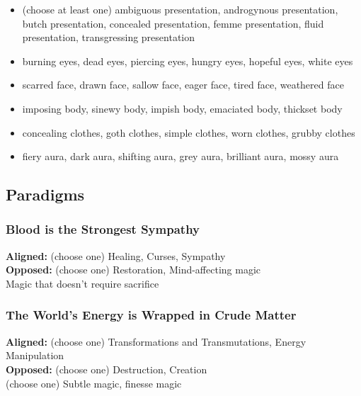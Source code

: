 \documentclass[
]{memoir}
\begin{document}
\begin{itemize}
\tightlist
\item
  (choose at least one) ambiguous presentation, androgynous
  presentation, butch presentation, concealed presentation, femme
  presentation, fluid presentation, transgressing presentation
\item
  burning eyes, dead eyes, piercing eyes, hungry eyes, hopeful eyes,
  white eyes
\item
  scarred face, drawn face, sallow face, eager face, tired face,
  weathered face
\item
  imposing body, sinewy body, impish body, emaciated body, thickset body
\item
  concealing clothes, goth clothes, simple clothes, worn clothes, grubby
  clothes
\item
  fiery aura, dark aura, shifting aura, grey aura, brilliant aura, mossy
  aura
\end{itemize}

\hypertarget{paradigms-5}{%
\subsection{Paradigms}\label{paradigms-5}}

\hypertarget{blood-is-the-strongest-sympathy}{%
\subsubsection{Blood is the Strongest
Sympathy}\label{blood-is-the-strongest-sympathy}}

\textbf{Aligned:} (choose one) Healing, Curses, Sympathy\\
\textbf{Opposed:} (choose one) Restoration, Mind-affecting magic\\
Magic that doesn't require sacrifice

\hypertarget{the-worlds-energy-is-wrapped-in-crude-matter}{%
\subsubsection{The World's Energy is Wrapped in Crude
Matter}\label{the-worlds-energy-is-wrapped-in-crude-matter}}

\textbf{Aligned:} (choose one) Transformations and Transmutations,
Energy Manipulation\\
\textbf{Opposed:} (choose one) Destruction, Creation\\
(choose one) Subtle magic, finesse magic
\end{document}
